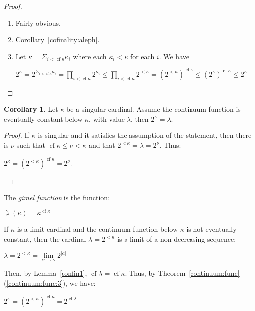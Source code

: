 \documentclass[8pt]{article}
\theoremstyle{definition}
\theoremstyle{definition}
\theoremstyle{definition}
\theoremstyle{definition}
\theoremstyle{definition}
\theoremstyle{definition}
\theoremstyle{definition}
\theoremstyle{definition}
\theoremstyle{definition}
\theoremstyle{definition}
\theoremstyle{definition}
\theoremstyle{definition}
\theoremstyle{definition}
\theoremstyle{definition}
\newtheorem{col}{Corollary}[section]
\theoremstyle{question}
\begin{document}
\begin{proof}
  
  $ $

  \begin{enumerate}
    \item Fairly obvious.
    \item Corollary~\ref{cofinality:aleph}.
    \item Let $\kappa = \Sigma_{i < \operatorname{cf} \kappa} \kappa_i$ where each $\kappa_i < \kappa$ for each $i$.
    We have
    \begin{center}
      $2^{\kappa} = 2^{\Sigma_{i < \operatorname{cf} \kappa} \kappa_i} = \prod \limits_{i < \operatorname{cf} \kappa} 2^{\kappa_i} \leq \prod \limits_{i < \operatorname{cf} \kappa} 2^{< \kappa} = (2^{< \kappa})^{\operatorname{cf} \kappa} \leq (2^{\kappa})^{\operatorname{cf} \kappa} \leq 2^{\kappa}$
    \end{center}
  \end{enumerate}
\end{proof}

\begin{col}
  Let $\kappa$ be a singular cardinal. 
  Assume the continuum function is eventually constant below $\kappa$, with value $\lambda$, 
  then $2^{\kappa} = \lambda$.
\end{col}

\begin{proof}
  If $\kappa$ is singular and it satisfies the assumption of the statement, then
  there is $\nu$ such that $\operatorname{cf} \kappa \leq \nu < \kappa$ and that
  $2^{< \kappa} = \lambda = 2^{\nu}$. Thus:
  \begin{center}
    $2^{\kappa} = (2^{<\kappa})^{\operatorname{cf} \kappa} = 2^{\nu}$.
  \end{center}
\end{proof}

The \emph{gimel function} is the function:
\begin{center}
  $\gimel(\kappa) = \kappa^{\operatorname{cf} \kappa}$
\end{center}

If $\kappa$ is a limit cardinal and the continuum function below $\kappa$ is not eventually constant,
then the cardinal $\lambda = 2^{<\kappa}$ is a limit of a non-decreasing sequence:
\begin{center}
  $\lambda = 2^{<\kappa} = \lim \limits_{\alpha \to \kappa} 2^{|\alpha|}$
\end{center}
Then, by Lemma~\ref{confin1}, $\operatorname{cf} \lambda = \operatorname{cf} \kappa$.
Thus, by Theorem~\ref{continuum:func}(\ref{continuum:func:3}), we have:
\begin{center}
$2^{\kappa} = (2^{<\kappa})^{\operatorname{cf} \kappa} = 2^{\operatorname{cf} \lambda}$
\end{center}
\end{document}
